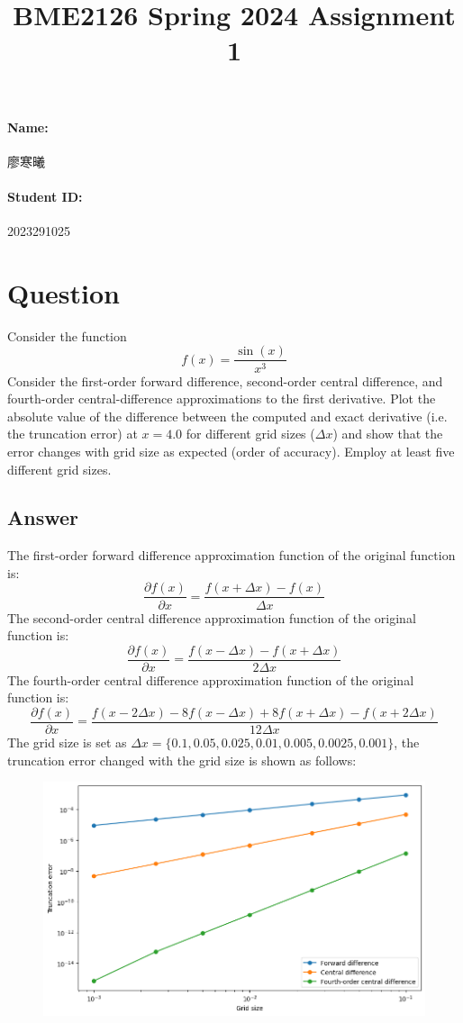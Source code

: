 \documentclass{article}
\begin{document}
\title{BME2126 Spring 2024 Assignment 1}
\maketitle
\paragraph{Name:} 
\begin{CJK}{UTF8}{gbsn}
廖寒曦
\end{CJK}
\paragraph{Student ID:} 2023291025

\section*{Question}
Consider the function
$$f(x)=\frac{\sin(x)}{x^3}$$
Consider the first-order forward difference, second-order central difference, and fourth-order central-difference approximations to the first derivative. Plot the absolute value of the difference between the computed and exact derivative (i.e. the truncation error) at $x=4.0$ for different grid sizes ($\Delta x$) and show that the error changes with grid size as expected (order of accuracy). Employ at least five different grid sizes.

\subsection*{Answer}
The first-order forward difference approximation function of the original function is: $$\frac{\partial f(x)}{\partial x} = \frac{f(x+\Delta x) - f(x)}{\Delta x}$$
The second-order central difference approximation function of the original function is: $$\frac{\partial f(x)}{\partial x} = \frac{f(x-\Delta x) - f(x+\Delta x)}{2\Delta x}$$
The fourth-order central difference approximation function of the original function is: $$\frac{\partial f(x)}{\partial x} = \frac{ f(x-2\Delta x) - 8f(x -\Delta x) + 8f(x +\Delta x) - f(x+2\Delta x)}{12\Delta x}$$
The grid size is set as $\Delta x = \{ 0.1, 0.05, 0.025, 0.01, 0.005, 0.0025, 0.001\}$, the truncation error changed with the grid size is shown as follows:
\begin{figure}[htpb]
    \centering
    \includegraphics[scale=0.4]{truncation error.png}
    \label{fig:enter-label}
\end{figure}
\end{document}
